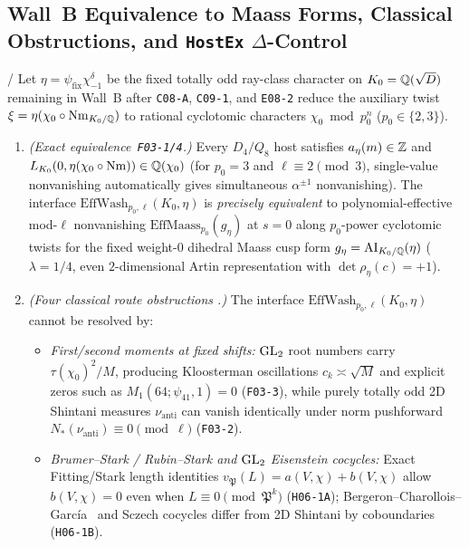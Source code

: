 \subsection{Wall~B Equivalence to Maass Forms, Classical Obstructions, and \texttt{HostEx} $\Delta$-Control}\label{sec:6:hostex}

\begin{theorem}\label{thm:6:wallb}
\tagProved{} / \tagObs{}
Let $\eta = \psi_{\mathrm{fix}}\chi_{-1}^\delta$ be the fixed totally odd ray-class character on $K_0 = \mathbb{Q}(\sqrt{D})$ remaining in Wall~B after \texttt{C08-A}, \texttt{C09-1}, and \texttt{E08-2} reduce the auxiliary twist $\xi = \eta (\chi_0 \circ \operatorname{Nm}_{K_0/\mathbb{Q}})$ to rational cyclotomic characters $\chi_0 \bmod p_0^n$ ($p_0 \in \{2,3\}$).
\begin{enumerate}[label=\textup{(\roman*)}]
\item \emph{(Exact equivalence~\texttt{F03-1/4}.)} Every $D_4/Q_8$ host satisfies $a_\eta(m) \in \mathbb{Z}$ and $L_{K_0}(0, \eta(\chi_0\circ\operatorname{Nm})) \in \mathbb{Q}(\chi_0)$ (for $p_0=3$ and $\ell \equiv 2 \pmod 3$, single-value nonvanishing automatically gives simultaneous $\alpha^{\pm 1}$ nonvanishing). The interface $\mathrm{EffWash}_{p_0,\ell}(K_0, \eta)$ is \emph{precisely equivalent} to polynomial-effective mod-$\ell$ nonvanishing $\mathrm{EffMaass}_{p_0}(g_\eta)$ at $s=0$ along $p_0$-power cyclotomic twists for the fixed weight-$0$ dihedral Maass cusp form $g_\eta = \mathrm{AI}_{K_0/\mathbb{Q}}(\eta)$ ($\lambda = 1/4$, even $2$-dimensional Artin representation with $\det\rho_\eta(c) = +1$).
\item \emph{(Four classical route obstructions \tagObs{}.)} The interface $\mathrm{EffWash}_{p_0,\ell}(K_0,\eta)$ cannot be resolved by:
\begin{itemize}
\item \emph{First/second moments at fixed shifts:} $\mathrm{GL}_2$ root numbers carry $\tau(\chi_0)^2/M$, producing Kloosterman oscillations $c_k \asymp \sqrt{M}$ and explicit zeros such as $M_1(64; \psi_{41}, 1) = 0$ (\texttt{F03-3}), while purely totally odd 2D Shintani measures $\nu_{\mathrm{anti}}$ can vanish identically under norm pushforward $N_*(\nu_{\mathrm{anti}}) \equiv 0 \pmod{\ell}$ (\texttt{F03-2}).
\item \emph{Brumer--Stark / Rubin--Stark and $\mathrm{GL}_2$ Eisenstein cocycles:} Exact Fitting/Stark length identities $v_\mathfrak{P}(L) = a(V,\chi) + b(V,\chi)$ allow $b(V,\chi) = 0$ even when $L \equiv 0 \pmod{\mathfrak{P}^k}$ (\texttt{H06-1A}); Bergeron--Charollois--Garc\'ia~\cite{BCG2020} and Sczech cocycles differ from 2D Shintani by coboundaries (\texttt{H06-1B}).

\end{itemize}
\end{enumerate}
\end{theorem}
